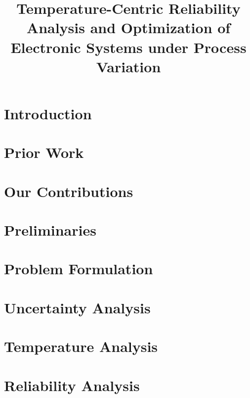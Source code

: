 \documentclass[conference]{IEEEtran}
\title{{\fontsize{21}{26}\selectfont Temperature-Centric Reliability Analysis and Optimization of Electronic Systems under Process Variation}}
\author{\vspace{-1em}}
\begin{document}
  \maketitle

  \begin{abstract}
    
  \end{abstract}


  \section{Introduction} 
  

  \section{Prior Work} 
  

  \section{Our Contributions} 
  

  \section{Preliminaries} 
  

  \section{Problem Formulation} 
  

  \section{Uncertainty Analysis} 
  

  \section{Temperature Analysis} 
  

  \section{Reliability Analysis} 
  
\end{document}
